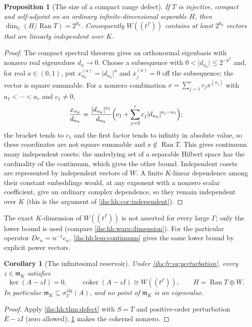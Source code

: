 \documentclass[11pt,a4paper]{article}
\numberwithin{equation}{section}
\newtheorem{proposition}[proposition]{Proposition}
\newtheorem{corollary}[corollary]{Corollary}
\theoremstyle{definition}
\theoremstyle{remark}
\newcommand{\C}{\mathbb C}
\newcommand{\K}{K}
\newcommand{\mK}{\mathfrak m_K}
\newcommand{\Ran}{\operatorname{Ran}}
\newcommand{\coker}{\operatorname{coker}}
\newcommand{\abs}[1]{\lvert#1\rvert}
\begin{document}
\begin{proposition}[The size of a compact range defect]\label{ihs:fr:prop:continuum}
If $T$ is injective, compact and self-adjoint on an ordinary
infinite-dimensional separable $H$, then $\dim_\C(H/\Ran T)=2^{\aleph_0}$.
Consequently $W((t^\Gamma))$ contains at least $2^{\aleph_0}$ vectors that
are linearly independent over $\K$.
\end{proposition}
\begin{proof}
The compact spectral theorem gives an orthonormal eigenbasis with nonzero
real eigenvalues $d_n\to0$. Choose a subsequence with
$0<\abs{d_{n_k}}\le2^{-k^2}$ and, for real $a\in(0,1)$, put
$x^{(a)}_{n_k}=\abs{d_{n_k}}^a$ and $x^{(a)}_j=0$ off the subsequence; the
vector is square summable. For a nonzero combination
$x=\sum_{j=1}^rc_jx^{(a_j)}$ with $a_1<\cdots<a_r$ and $c_1\ne0$,
\[
 \frac{x_{n_k}}{d_{n_k}}=\frac{\abs{d_{n_k}}^{a_1}}{d_{n_k}}
 \Bigl(c_1+\sum_{j=2}^rc_j\abs{d_{n_k}}^{a_j-a_1}\Bigr);
\]
the bracket tends to $c_1$ and the first factor tends to infinity in
absolute value, so these coordinates are not square summable and
$x\notin\Ran T$. This gives continuum many independent cosets; the
underlying set of a separable Hilbert space has the cardinality of the
continuum, which gives the other bound. Independent cosets are represented by
independent vectors of $W$. A finite $\K$-linear dependence among their
constant embeddings would, at any exponent with a nonzero scalar coefficient,
give an ordinary complex dependence, so they remain independent over $\K$
(this is the argument of \cref{ihs:hh:cor:independent}).
\end{proof}

The exact $\K$-dimension of $W((t^\Gamma))$ is not asserted for every large
$\Gamma$; only the lower bound is used (compare \cref{ihs:hh:warn:dimension}).
For the particular operator $De_n=n^{-1}e_n$, \cref{ihs:hh:lem:continuum}
gives the same lower bound by explicit power vectors.

\begin{corollary}[The infinitesimal reservoir]\label{ihs:fr:cor:reservoir}
Under \eqref{ihs:fr:eq:perturbation}, every $z\in\mK$ satisfies
\[
 \ker(A-zI)=0,\qquad \coker(A-zI)\cong W((t^\Gamma)),\qquad
 H=\Ran T\oplus W.
\]
In particular $\mK\subseteq\sigma^{\mathrm{alg}}_\Gamma(A)$, and no point of
$\mK$ is an eigenvalue.
\end{corollary}
\begin{proof}
Apply \cref{ihs:hh:thm:defect} with $S=T$ and positive-order perturbation
$E-zI$ (zero allowed); \cref{ihs:fr:prop:continuum} makes the cokernel
nonzero.
\end{proof}
\end{document}

